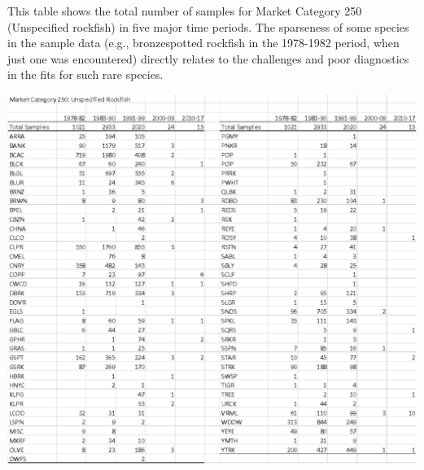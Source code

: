 \documentclass[ xcolor = pdftex, dvipsnames, table ]{beamer}
\begin{document}
%
%

%
\begin{frame}
\hspace*{-0.5cm}
\begin{minipage}{0.29\textwidth}
\small
This table shows the total number of samples for Market Category 250 
(Unspecified rockfish) in five major time periods. 
The sparseness of some species in the sample data (e.g., bronzespotted rockfish in 
the 1978-1982 period, when just one was encountered) directly relates to the 
challenges and poor diagnostics in the fits for such rare species.   
\end{minipage}
\begin{minipage}{0.69\textwidth}
	\hspace*{0.5cm}
	\includegraphics[height=1\textheight]{./pictures/sampleTable250.pdf} 
\end{minipage}
\end{frame}

%
%
\end{document}
